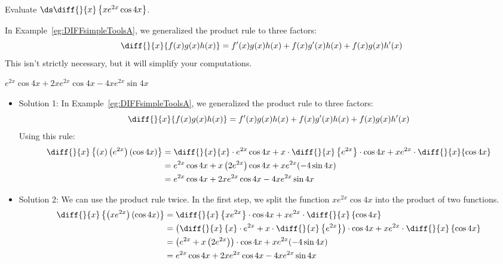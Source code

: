\begin{question}[2011H]
Evaluate $\ds\diff{}{x}\left\{x e^{2x} \cos 4x\right\}$.
\end{question}
\begin{hint}
In Example~\ref*{eg:DIFFsimpleToolsA}, we generalized the product rule to three factors:
\[\diff{}{x}\{f(x)g(x)h(x)\}=f'(x)g(x)h(x)+f(x)g'(x)h(x)+f(x)g(x)h'(x)\]
This isn't strictly necessary, but it will simplify your computations.
\end{hint}
\begin{answer}
$e^{2x} \cos 4x + 2x e^{2x} \cos 4x -4 x e^{2x} \sin 4x$
\end{answer}
\begin{solution}
\begin{itemize}
\item Solution 1:
In Example~\ref*{eg:DIFFsimpleToolsA}, we generalized the product rule to three factors:
\[\diff{}{x}\{f(x)g(x)h(x)\}=f'(x)g(x)h(x)+f(x)g'(x)h(x)+f(x)g(x)h'(x)\]
Using this rule:
\begin{align*}
\diff{}{x}\left\{(x) \left(e^{2x}\right)( \cos 4x)\right\}&=\diff{}{x}\{x\}\cdot e^{2x} \cos 4x
+
x\cdot\diff{}{x}\left\{e^{2x}\right\}\cdot\cos 4x
+
xe^{2x}\cdot\diff{}{x}\{\cos 4x\}\\
&=e^{2x}\cos4x+x\left(2e^{2x}\right)\cos4x+
xe^{2x}(-4\sin 4x)\\
&=e^{2x}\cos4x+2xe^{2x}\cos4x-4xe^{2x}\sin 4x
\end{align*}

\item Solution 2: We can use the product rule twice. In the first step, we split the function $x e^{2x} \cos 4x$ into the product of two functions.
\begin{align*}
\diff{}{x}\left\{\left(x e^{2x}\right) (\cos 4x)\right\}&=
\diff{}{x}\left\{xe^{2x}\right\}\cdot\cos4x
+
xe^{2x}\cdot\diff{}{x}\left\{ \cos 4x\right\}\\
&=
\left(
\diff{}{x}\left\{x\right\}\cdot e^{2x}+
x\cdot\diff{}{x}\left\{e^{2x}\right\}
\right)\cdot\cos4x
+
xe^{2x}\cdot\diff{}{x}\left\{ \cos 4x\right\}\\
&=
\left(
e^{2x}+
x\left(2e^{2x}\right)
\right)\cdot\cos4x
+
xe^{2x}(-4\sin 4x)\\
&=e^{2x}\cos4x+2xe^{2x}\cos4x-4xe^{2x}\sin4x
\end{align*}
\end{itemize}
\end{solution}

\subsection*{\Application}



